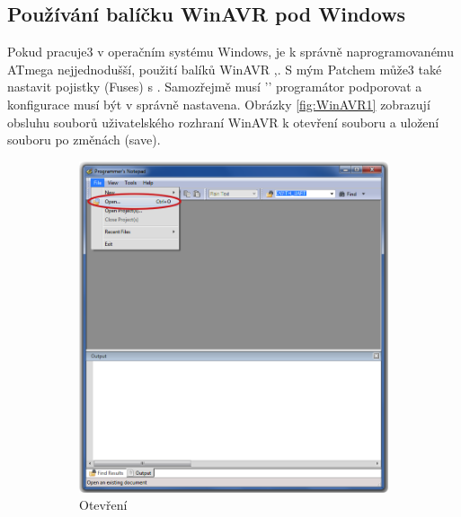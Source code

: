 \subsection{Používání balíčku WinAVR pod Windows}
Pokud pracuje3 v operačním systému Windows, je k správně naprogramovanému ATmega nejjednodušší,
použití balíků WinAVR \cite{winavr1},\cite{winavr2}.
S mým Patchem \cite{winavr3} může3 také nastavit pojistky (Fuses) s . Samozřejmě musí '' programátor podporovat a konfigurace musí být v  správně nastavena.
Obrázky \ref{fig:WinAVR1} zobrazují obsluhu souborů uživatelského rozhraní WinAVR k otevření souboru  a uložení souboru  po změnách (save).
\begin{figure}[H]
  \begin{subfigure}[b]{.5\textwidth}
    \centering
    \includegraphics[width=.85\textwidth]{../PNG/Notepad_open.png}
    \caption{Otevření }
  \end{subfigure}
  ~
  \begin{subfigure}[b]{.5\textwidth}
    \centering

\end{subfigure}
\end{figure}
